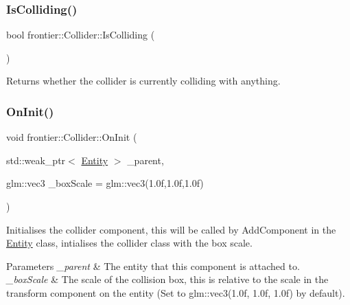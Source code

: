 \subsubsection{\texorpdfstring{Is\+Colliding()}{IsColliding()}}
{\footnotesize\ttfamily bool frontier\+::\+Collider\+::\+Is\+Colliding (\begin{DoxyParamCaption}{ }\end{DoxyParamCaption})}



Returns whether the collider is currently colliding with anything. 

\mbox{\label{classfrontier_1_1_collider_aa11b97036f0962e2abcb79b4d84b8687}} 
\subsubsection{\texorpdfstring{On\+Init()}{OnInit()}\hspace{0.1cm}{\footnotesize\ttfamily [1/2]}}
{\footnotesize\ttfamily void frontier\+::\+Collider\+::\+On\+Init (\begin{DoxyParamCaption}\item[{std\+::weak\+\_\+ptr$<$ \hyperlink{classfrontier_1_1_entity}{Entity} $>$}]{\+\_\+parent,  }\item[{glm\+::vec3}]{\+\_\+box\+Scale = {\ttfamily glm\+:\+:vec3(1.0f,1.0f,1.0f)} }\end{DoxyParamCaption})}



Initialises the collider component, this will be called by Add\+Component in the \hyperlink{classfrontier_1_1_entity}{Entity} class, intialises the collider class with the box scale. 


\begin{DoxyParams}{Parameters}
{\em \+\_\+parent} & The entity that this component is attached to. \\
\hline
{\em \+\_\+box\+Scale} & The scale of the collision box, this is relative to the scale in the transform component on the entity (Set to glm\+::vec3(1.\+0f, 1.\+0f, 1.\+0f) by default). \\
\hline
\end{DoxyParams}
\mbox{\label{classfrontier_1_1_collider_a06dfeb56017f45597f1812fc5cf8236d}} 

